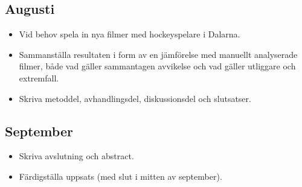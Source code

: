 \documentclass[a4paper,12pt]{article}
\begin{document}
\subsection*{Augusti}
\begin{itemize}
  \item Vid behov spela in nya filmer med hockeyspelare i Dalarna.
  \item Sammanställa resultaten i form av en jämförelse med manuellt
    analyserade filmer, både vad gäller sammantagen avvikelse och vad
    gäller utliggare och extremfall.
  \item Skriva metoddel, avhandlingsdel, diskussionsdel och slutsatser.
\end{itemize}

\subsection*{September}
\begin{itemize}
  \item Skriva avslutning och abstract.
  \item Färdigställa uppsats (med slut i mitten av september).
\end{itemize}

\printbibliography{}
\end{document}
